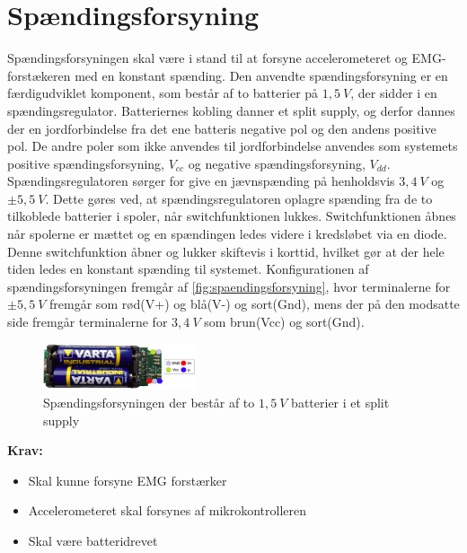 \section{Spændingsforsyning}
Spændingsforsyningen skal være i stand til at forsyne accelerometeret og EMG-forstækeren med en konstant spænding. Den anvendte spændingsforsyning er en færdigudviklet komponent, som består af to batterier på $1,5~V$, der sidder i en spændingsregulator. Batteriernes kobling danner et split supply, og derfor dannes der en jordforbindelse fra det ene batteris negative pol og den andens positive pol. De andre poler som ikke anvendes til jordforbindelse anvendes som systemets positive spændingsforsyning, ${V}_{cc}$ og negative spændingsforsyning, ${V}_{dd}$.
Spændingsregulatoren sørger for give en jævnspænding på henholdsvis $3,4~V$ og $\pm 5,5~V$. Dette gøres ved, at spændingsregulatoren oplagre spænding fra de to tilkoblede batterier i spoler, når switchfunktionen lukkes. Switchfunktionen åbnes når spolerne er mættet og en spændingen ledes videre i kredsløbet via en diode. Denne switchfunktion åbner og lukker skiftevis i korttid, hvilket gør at der hele tiden ledes en konstant spænding til systemet. 
Konfigurationen af spændingsforsyningen fremgår af \autoref{fig:spaendingsforsyning}, hvor terminalerne for $\pm 5,5~V$ fremgår som rød(V+) og blå(V-) og sort(Gnd), mens der på den modsatte side fremgår terminalerne for $3,4~V$ som brun(Vcc) og sort(Gnd). 

\begin{figure}[H]
\centering
\includegraphics[width=0.4\textwidth]{figures/spaendingsforsyning}
\caption{Spændingsforsyningen der består af to $1,5~V$ batterier i et split supply}
\label{fig:spaendingsforsyning}
\end{figure}

\textbf{Krav:}
\begin{itemize} 
\item Skal kunne forsyne EMG forstærker
\item Accelerometeret skal forsynes af mikrokontrolleren
\item Skal være batteridrevet 
\end{itemize}
